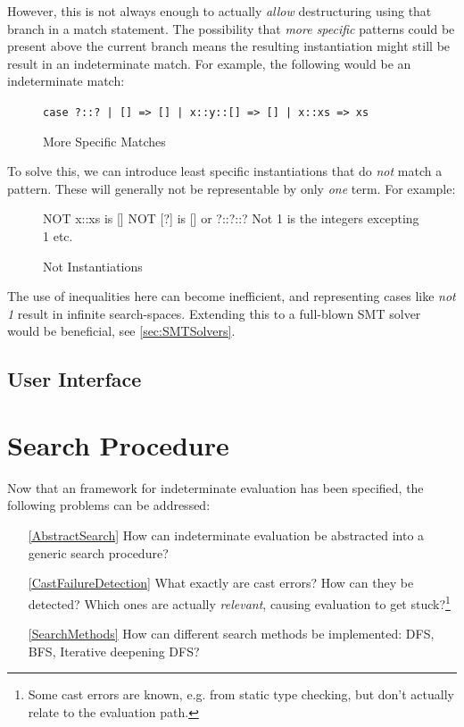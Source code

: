 However, this is not always enough to actually \textit{allow} destructuring using that branch in a match statement. The possibility that \textit{more specific} patterns could be present above the current branch means the resulting instantiation might still be result in an indeterminate match. For example, the following would be an indeterminate match:

\begin{figure}[H]
\texttt{case ?::? | [] => [] | x::y::[] => [] | x::xs => xs}

\caption{More Specific Matches}
\end{figure}

To solve this, we can introduce least specific instantiations that do \textit{not} match a pattern. These will generally not be representable by only \textit{one} term. For example:
\begin{figure}
NOT x::xs is []
NOT [?] is [] or ?::?::? 
Not 1 is the integers excepting 1
etc.
\caption{Not Instantiations}
\end{figure}

The use of inequalities here can become inefficient, and representing cases like \textit{not 1} result in infinite search-spaces. Extending this to a full-blown SMT solver would be beneficial, see \cref{sec:SMTSolvers}.

\subsection{User Interface}\label{sec:UIIndetEval}

\section{Search Procedure}\label{sec:SearchProcedure}
Now that an framework for indeterminate evaluation has been specified, the following problems can be addressed:
\begin{itemize}
\item[\ref{AbstractSearch}] How can indeterminate evaluation be abstracted into a generic search procedure?
\item[\ref{CastFailureDetection}] What exactly are cast errors? How can they be detected? Which ones are actually \textit{relevant}, causing evaluation to get stuck?\footnote{Some cast errors are known, e.g. from static type checking, but don't actually relate to the evaluation path.}
\item[\ref{SearchMethods}] How can different search methods be implemented: DFS, BFS, Iterative deepening DFS? 
\end{itemize}

